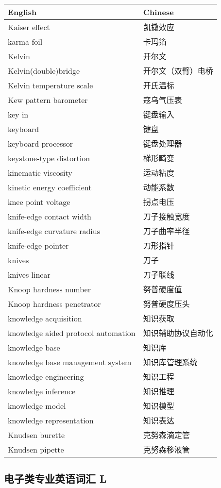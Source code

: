 \documentclass[
]{article}
\begin{document}
\begin{longtable}[]{@{}ll@{}}
\toprule()
English & Chinese \\
\midrule()
\endhead
Kaiser effect & 凯撒效应 \\
karma foil & 卡玛箔 \\
Kelvin & 开尔文 \\
Kelvin(double)bridge & 开尔文（双臂）电桥 \\
Kelvin temperature scale & 开氏温标 \\
Kew pattern barometer & 寇乌气压表 \\
key in & 键盘输入 \\
keyboard & 键盘 \\
keyboard processor & 键盘处理器 \\
keystone-type distortion & 梯形畸变 \\
kinematic viscosity & 运动粘度 \\
kinetic energy coefficient & 动能系数 \\
knee point voltage & 拐点电压 \\
knife-edge contact width & 刀子接触宽度 \\
knife-edge curvature radius & 刀子曲率半径 \\
knife-edge pointer & 刀形指针 \\
knives & 刀子 \\
knives linear & 刀子联线 \\
Knoop hardness number & 努普硬度值 \\
Knoop hardness penetrator & 努普硬度压头 \\
knowledge acquisition & 知识获取 \\
knowledge aided protocol automation & 知识辅助协议自动化 \\
knowledge base & 知识库 \\
knowledge base management system & 知识库管理系统 \\
knowledge engineering & 知识工程 \\
knowledge inference & 知识推理 \\
knowledge model & 知识模型 \\
knowledge representation & 知识表达 \\
Knudsen burette & 克努森滴定管 \\
Knudsen pipette & 克努森移液管 \\
\bottomrule()
\end{longtable}

\hypertarget{ux7535ux5b50ux7c7bux4e13ux4e1aux82f1ux8bedux8bcdux6c47--l}{%
\subsection{电子类专业英语词汇
L}\label{ux7535ux5b50ux7c7bux4e13ux4e1aux82f1ux8bedux8bcdux6c47--l}}
\end{document}

